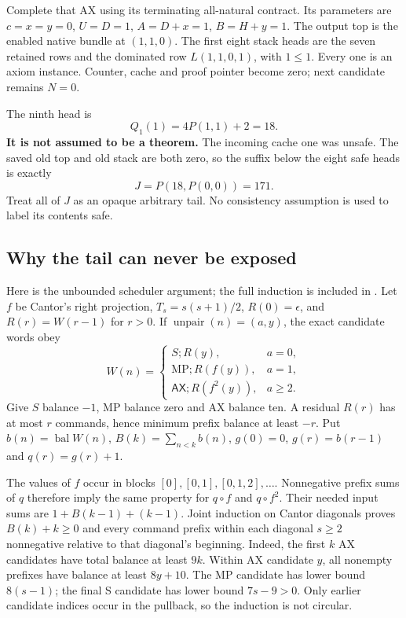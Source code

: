 \documentclass[11pt]{article}
\newcommand{\file}[1]{{\small\path{#1}}}
\newcommand{\AX}{\mathsf{AX}}
\begin{document}
Complete that AX using its terminating all-natural contract. Its parameters are $c=x=y=0$, $U=D=1$, $A=D+x=1$, $B=H+y=1$. The output top is the enabled native bundle at $(1,1,0)$. The first eight stack heads are the seven retained rows and the dominated row $L(1,1,0,1)$, with $1\le1$. Every one is an axiom instance. Counter, cache and proof pointer become zero; next candidate remains $N=0$.

The ninth head is
\[
 Q_1(1)=4P(1,1)+2=18.
\]
\textbf{It is not assumed to be a theorem.} The incoming cache one was unsafe. The saved old top and old stack are both zero, so the suffix below the eight safe heads is exactly
\[
 J=P(18,P(0,0))=171.
\]
Treat all of $J$ as an opaque arbitrary tail. No consistency assumption is used to label its contents safe.

\subsection*{Why the tail can never be exposed}
Here is the unbounded scheduler argument; the full induction is included in \file{primary/proofs/protected_credit.md}. Let $f$ be Cantor's right projection, $T_s=s(s+1)/2$, $R(0)=\epsilon$, and $R(r)=W(r-1)$ for $r>0$. If $\operatorname{unpair}(n)=(a,y)$, the exact candidate words obey
\[
 W(n)=\begin{cases}
 S;R(y),&a=0,\\
 \mathrm{MP};R(f(y)),&a=1,\\
 \AX;R(f^2(y)),&a\ge2.
 \end{cases}
\]
Give $S$ balance $-1$, MP balance zero and AX balance ten. A residual $R(r)$ has at most $r$ commands, hence minimum prefix balance at least $-r$. Put $b(n)=\operatorname{bal}W(n)$, $B(k)=\sum_{n<k}b(n)$, $g(0)=0$, $g(r)=b(r-1)$ and $q(r)=g(r)+1$.

The values of $f$ occur in blocks $[0],[0,1],[0,1,2],\ldots$. Nonnegative prefix sums of $q$ therefore imply the same property for $q\circ f$ and $q\circ f^2$. Their needed input sums are $1+B(k-1)+(k-1)$. Joint induction on Cantor diagonals proves $B(k)+k\ge0$ and every command prefix within each diagonal $s\ge2$ nonnegative relative to that diagonal's beginning. Indeed, the first $k$ AX candidates have total balance at least $9k$. Within AX candidate $y$, all nonempty prefixes have balance at least $8y+10$. The MP candidate has lower bound $8(s-1)$; the final S candidate has lower bound $7s-9>0$. Only earlier candidate indices occur in the pullback, so the induction is not circular.
\end{document}
